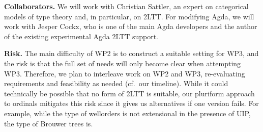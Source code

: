 \documentclass[a4paper,11pt]{article}
\renewcommand{\paragraph}[1]{\textbf{#1.}}
\begin{document}
\paragraph{Collaborators}
We will work with Christian Sattler, an expert on categorical models of type theory and, in particular, on 2LTT.
For modifying Agda, we will work with Jesper Cockx, who is one of the main Agda developers and the author of the existing experimental Agda 2LTT support.


\paragraph{Risk}
The main difficulty of WP2 is to construct a suitable setting for WP3, and the risk is that the full set of needs will only become clear when attempting WP3.
Therefore, we plan to interleave work on WP2 and WP3, %
re-evaluating requirements and feasibility as needed (cf.\ our timeline).
%
While it could technically be possible that no form of 2LTT is suitable,
our pluriform approach to ordinals mitigates this risk since it gives us alternatives if one version fails.
%
For example, while the type of wellorders is not extensional in the presence of UIP, the type of Brouwer trees is.

\end{document}
